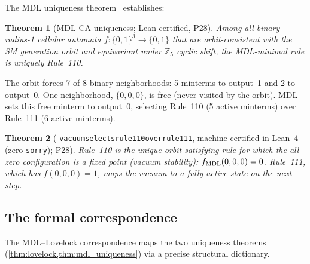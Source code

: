 \documentclass[11pt]{article}
\newtheorem{theorem}{Theorem}[section]
\theoremstyle{remark}
\newcommand{\lean}[1]{%
  \penalty-100
  \begingroup\def\_{\textunderscore\allowbreak}\texttt{#1}\endgroup}
\newcommand{\CatAL}{machine-certified in Lean~4 (zero \texttt{sorry})}
\begin{document}
The MDL uniqueness theorem~\cite{SpivackCompUniversality} establishes:

\begin{theorem}[MDL-CA uniqueness; Lean-certified, P28]
\label{thm:mdl_uniqueness}
Among all binary radius-1 cellular automata $f: \{0,1\}^3 \to \{0,1\}$
that are orbit-consistent with the SM generation orbit and equivariant under
$\mathbb{Z}_5$ cyclic shift, the MDL-minimal rule is uniquely Rule~110.
\end{theorem}

The orbit forces 7 of 8 binary neighborhoods:
5 minterms to output~1 and 2 to output~0.
One neighborhood, $\{0,0,0\}$, is free (never visited by the orbit).
MDL sets this free minterm to output~0, selecting Rule~110 (5 active
minterms) over Rule~111 (6 active minterms).

\begin{theorem}[\lean{vacuum\_selects\_rule110\_over\_rule111}, \CatAL; P28]
\label{thm:vacuum_stability}
Rule~110 is the unique orbit-satisfying rule for which the all-zero
configuration is a fixed point (vacuum stability):
$f_{\rm MDL}(0,0,0) = 0$.
Rule~111, which has $f(0,0,0) = 1$, maps the vacuum to a fully active state
on the next step.
\end{theorem}

\subsection{The formal correspondence}
\label{ssec:formal_dict}

The MDL--Lovelock correspondence maps the two uniqueness theorems
(\cref{thm:lovelock,thm:mdl_uniqueness}) via a precise structural dictionary.
\end{document}

